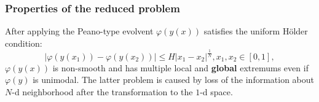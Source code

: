 \documentclass[aspectratio=1610]{beamer}
\begin{document}
\begin{frame}
  \frametitle{Properties of the reduced problem}
  After applying the Peano-type evolvent \(\varphi(y(x))\) satisfies the uniform H{\"o}lder condition:
  \begin{displaymath}
    |\varphi(y(x_1))-\varphi(y(x_2))|\leq H{|x_1-x_2|}^{\frac{1}{N}}, x_1,x_2\in[0,1],
  \end{displaymath}
  \(\varphi(y(x))\) is non-smooth and has multiple local and \textbf{global} extremums even if \(\varphi(y)\) is unimodal.
  The latter problem is caused by loss of the information about \(N\)-d neighborhood after the transformation to the \(1\)-d space.

  \begin{figure}[ht]
    \begin{center}

    \vspace*{-0.5cm}
  \end{center}
  \end{figure}
\end{frame}
\end{document}
